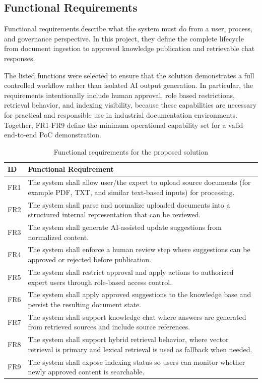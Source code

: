 \subsection{Functional Requirements}

Functional requirements describe what the system must do from a user, process, and governance perspective.
In this project, they define the complete lifecycle from document ingestion to approved knowledge publication and retrievable chat responses.

\vspace{0.4cm}

The listed functions were selected to ensure that the solution demonstrates a full controlled workflow rather than isolated AI output generation.
In particular, the requirements intentionally include human approval, role based restrictions, retrieval behavior, and indexing visibility, because these capabilities are necessary for practical and responsible use in industrial documentation environments.
Together, FR1-FR9 define the minimum operational capability set for a valid end-to-end PoC demonstration.


\begin{table}[H]
\centering
\small
\begin{tabular}{p{1.8cm} p{12.5cm}}
\textbf{ID} & \textbf{Functional Requirement} \\ 
\hline

FR1 & The system shall allow user/the expert to upload source documents (for example PDF, TXT, and similar text-based inputs) for processing. \\ 
\hline
FR2 & The system shall parse and normalize uploaded documents into a structured internal representation that can be reviewed. \\ 
\hline
FR3 & The system shall generate AI-assisted update suggestions from normalized content. \\ 
\hline
FR4 & The system shall enforce a human review step where suggestions can be approved or rejected before publication. \\ 
\hline
FR5 & The system shall restrict approval and apply actions to authorized expert users through role-based access control. \\ 
\hline
FR6 & The system shall apply approved suggestions to the knowledge base and persist the resulting document state. \\
\hline
FR7 & The system shall support knowledge chat where answers are generated from retrieved sources and include source references. \\ 
\hline
FR8 & The system shall support hybrid retrieval behavior, where vector retrieval is primary and lexical retrieval is used as fallback when needed. \\ 
\hline
FR9 & The system shall expose indexing status so users can monitor whether newly approved content is searchable. \\ 

\hline
\end{tabular}
\caption{Functional requirements for the proposed solution}
\label{tab:functional_requirements}
\end{table}





